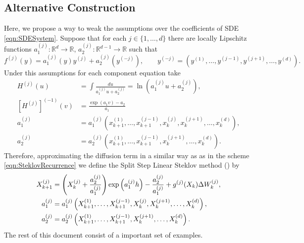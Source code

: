 \subsection{Alternative Construction}
Here, we propose a way to weak the assumptions over the coefficients of SDE
\eqref{eqn:SDESystem}.
Suppose that for each $j \in \{1, \dots, d \}$ there are locally Lipschitz functions 
$a_1^{(j)}:\mathbb{R}^{d} \to \mathbb{R}$, \quad 
$a_2^{(j)}:\mathbb{R}^{d-1} \to \mathbb{R}$ such that 
\begin{equation}\label{eqn:AlternativeConstruction}
	f^{(j)}(y) = a_1^{(j)}(y)y^{(j)} + a_2^{(j)}(y^{(-j)}), \qquad
	y^{(-j)} = (y^{(1)}, \dots ,y^{(j-1)}, y^{(j+1)}, \dots, y^{(d)}).
\end{equation}
	Under this assumptions for each component equation take
\begin{align*}
	H^{(j)}(u)	&= \int \frac{du}{a_1^{(j)} u + a_2^{(j)}} 
		= \ln \left( a_1^{(j)} u + a_2^{(j)} \right),\\
	\left[H^{(j)}\right]^{(-1)} (v) & = \frac{\exp(a_1 v ) - a_2}{a_1}\\
	a_1^{(j)} &=
		a_1^{(j)}
			\left(
				x^{(1)}_{k+1}, \dots, x^{(j-1)}_{k+1},
				x^{(j)}_{k} , x^{(j+1)}_{k},\dots,x^{(d)}_{k}
			\right),
			\\
	a_2^{(j)} &=
		a_2^{(j)}
			\left(
				x^{(1)}_{k+1}, \dots, x^{(j-1)}_{k+1},
				x^{(j+1)}_{k},\dots,x^{(d)}_{k}
			\right).
	\end{align*}
Therefore, approximating the diffusion term in a similar way as as in the scheme \eqref{eqn:SteklovRecurrence} 
we define the Split Step Linear Steklov method (\SM) by
\begin{align}\label{eqn:SteklovSchem2}
	X^{(j)}_{k+1} %
			&=
			\left(
				X_k^{(j)} + 
				\frac{a_2^{(j)} }{a_1^{(j)}}
			\right) 
			\exp\left(
					a_1^{(j)}h
				\right) - \frac{a_2^{(j)}}{a_1^{(j)}} 
		+ g^{(j)}(X_k) \Delta W^{(j)}_k, \notag\\
	a_1^{(j)} &=
		a_1^{(j)}
			\left(
				X^{(1)}_{k+1}, \dots, X^{(j-1)}_{k+1},
				X^{(j)}_{k} , X^{(j+1)}_{k},\dots,X^{(d)}_{k}
			\right),
			\\
	a_2^{(j)} &=
		a_2^{(j)}
			\left(
				X^{(1)}_{k+1}, \dots, X^{(j-1)}_{k+1},
				X^{(j+1)}_{k},\dots, X^{(d)}_{k}
			\right). \notag
\end{align}
The rest of this document consist of a important set of examples.
